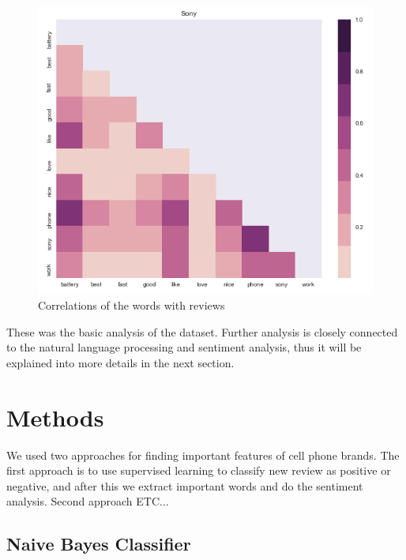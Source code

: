 \documentclass[11pt]{article}
\begin{document}
\begin{figure}[h!]
  \centering
    \includegraphics[width=\linewidth]{correlations.png}
  \caption{Correlations of the words with reviews}
  \label{fig:correlations}
\end{figure}

These was the basic analysis of the dataset. Further analysis is closely connected to the natural language processing and sentiment analysis, thus it will be explained into more details in the next section. 


\section{Methods}
We used two approaches for finding important features of cell phone brands. The first approach is to use supervised learning to classify new review as positive or negative, and after this we extract important words and do the sentiment analysis. Second approach ETC...


\subsection{Naive Bayes Classifier}
\end{document}
